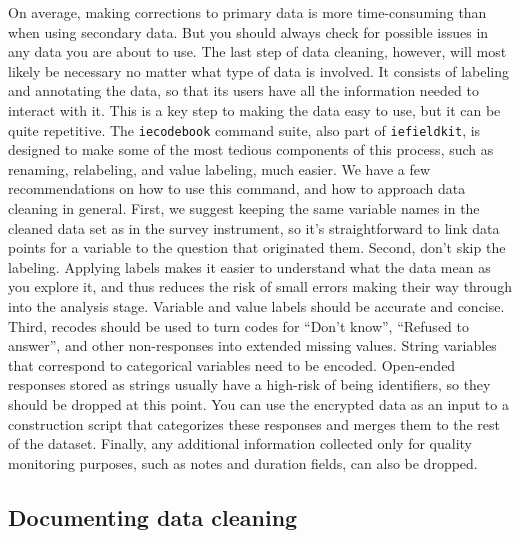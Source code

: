 On average, making corrections to primary data is more time-consuming than when using secondary data.
But you should always check for possible issues in any data you are about to use.
The last step of data cleaning, however,
will most likely be necessary no matter what type of data is involved.
It consists of labeling and annotating the data,
so that its users have all the information needed to interact with it.
This is a key step to making the data easy to use, but it can be quite repetitive.
The \texttt{iecodebook} command suite, also part of \texttt{iefieldkit},
is designed to make some of the most tedious components of this process,
such as renaming, relabeling, and value labeling, much easier.
We have a few recommendations on how to use this command,
and how to approach data cleaning in general.
First, we suggest keeping the same variable names in the cleaned data set as in the survey instrument,
so it's straightforward to link data points for a variable to the question that originated them.
Second, don't skip the labeling.
Applying labels makes it easier to understand what the data mean as you explore it,
and thus reduces the risk of small errors making their way through into the analysis stage.
Variable and value labels should be accurate and concise.
Third, recodes should be used to turn codes for ``Don't know'', ``Refused to answer'', and
other non-responses into extended missing values.
String variables that correspond to categorical variables need to be encoded.
Open-ended responses stored as strings usually have a high-risk of being identifiers,
so they should be dropped at this point.
You can use the encrypted data as an input to a construction script
that categorizes these responses and merges them to the rest of the dataset.
Finally, any additional information collected only for quality monitoring purposes,
such as notes and duration fields, can also be dropped.

\subsection{Documenting data cleaning}

